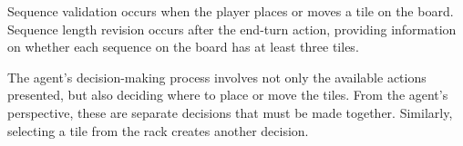 Sequence validation occurs when the player places or moves a tile on the board. Sequence length revision occurs after the end-turn action, providing information on whether each sequence on the board has at least three tiles. 

The agent's decision-making process involves not only the available actions presented, but also deciding where to place or move the tiles. From the agent's perspective, these are separate decisions that must be made together. Similarly, selecting a tile from the rack creates another decision.


%













